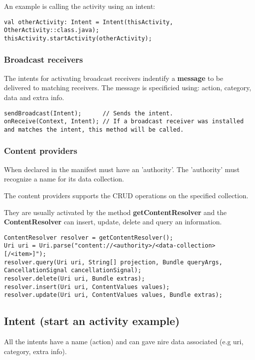 An example is calling the activity using an intent:
\begin{lstlisting}
val otherActivity: Intent = Intent(thisActivity, OtherActivity::class.java);
thisActivity.startActivity(otherActivity);
\end{lstlisting}

\subsubsection{Broadcast receivers}
The intents for activating broadcast receivers indentify a \textbf{message} to be delivered to matching receivers.
The message is specificied using: action, category, data and extra info.

\begin{lstlisting}
sendBroadcast(Intent);      // Sends the intent.
onReceive(Context, Intent); // If a broadcast receiver was installed and matches the intent, this method will be called.
\end{lstlisting}

\subsubsection{Content providers}
When declared in the manifest must have an 'authority'. The 'authority' must recognize a name for 
its data collection. 

The content providers supports the CRUD operations on the specified collection. 

They are usually activated by the method \textbf{getContentResolver} and the \textbf{ContentResolver} can
insert, update, delete and query an information.

\begin{lstlisting}
ContentResolver resolver = getContentResolver();
Uri uri = Uri.parse("content://<authority>/<data-collection>[/<item>]"); 
resolver.query(Uri uri, String[] projection, Bundle queryArgs, CancellationSignal cancellationSignal);
resolver.delete(Uri uri, Bundle extras); 
resolver.insert(Uri uri, ContentValues values);
resolver.update(Uri uri, ContentValues values, Bundle extras);
\end{lstlisting}

\subsection{Intent (start an activity example)}

All the intents have a name (action) and can gave nire data associated (e.g uri, category, extra info). 

